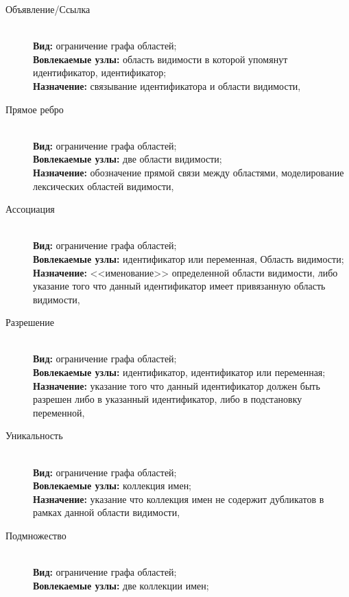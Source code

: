 \begin{description} \label{constraints-desc}
    \item[Объявление\slash Ссылка] \
        \\
        \textbf{Вид:} ограничение графа областей; \\
        \textbf{Вовлекаемые узлы:} область видимости в которой упомянут идентификатор, идентификатор; \\
        \textbf{Назначение:} связывание идентификатора и области видимости,
    \item[Прямое ребро] \
        \\
        \textbf{Вид:} ограничение графа областей; \\
        \textbf{Вовлекаемые узлы:} две области видимости; \\
        \textbf{Назначение:} обозначение прямой связи
        между областями, моделирование лексических областей видимости,
    \item[Ассоциация] \
        \\
        \textbf{Вид:} ограничение графа областей; \\
        \textbf{Вовлекаемые узлы:} идентификатор или переменная, Область видимости; \\
        \textbf{Назначение:} <<именование>> определенной
        области видимости, либо указание того что данный идентификатор имеет привязанную область видимости,
    \item[Разрешение] \
        \\
        \textbf{Вид:} ограничение графа областей; \\
        \textbf{Вовлекаемые узлы:} идентификатор, идентификатор или переменная; \\
        \textbf{Назначение:} указание того что
        данный идентификатор должен быть разрешен либо в указанный идентификатор, либо в подстановку переменной, 
    \item[Уникальность] \
        \\
        \textbf{Вид:} ограничение графа областей; \\
        \textbf{Вовлекаемые узлы:} коллекция имен; \\
        \textbf{Назначение:} указание что коллекция имен не содержит дубликатов
        в рамках данной области видимости, 
    \item[Подмножество] \
        \\
        \textbf{Вид:} ограничение графа областей; \\
        \textbf{Вовлекаемые узлы:} две коллекции имен; \\

\end{description}
